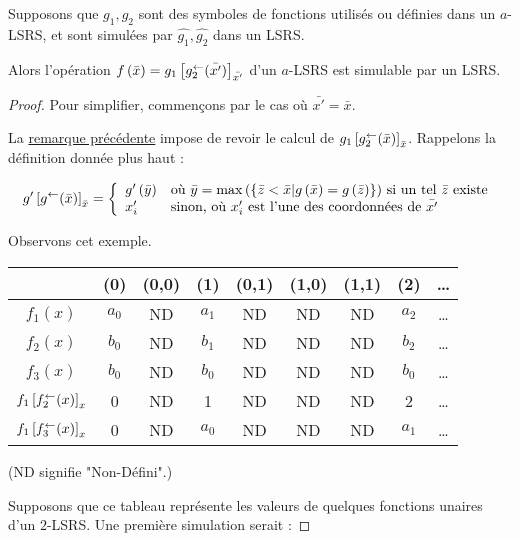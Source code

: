 	\begin{lemma}
		Supposons que $g_1, g_2$ sont des symboles de fonctions utilisés ou définies dans un $a$-LSRS, et sont simulées par $\hat{g_1},\hat{g_2}$ dans un LSRS.
		
		Alors l'opération $f\left(\bar{x}\right) = g_1\left[ g_2^{\leftarrow}(\bar{x'}) \right]_{\bar{x'}}$ d'un $a$-LSRS est simulable par un LSRS.
	\end{lemma}
	
	\begin{proof}		
		Pour simplifier, commençons par le cas où $\bar{x'} = \bar{x}$. 
		
		La \hyperref[rk:fonctions_en_attente]{remarque précédente} impose de revoir le calcul de $g_1\left[ g_2^{\leftarrow}(\bar{x}) \right]_{\bar{x}}$. Rappelons la définition donnée plus haut : 
		
		\[
			g'\left[ g^{\leftarrow}(\bar{x}) \right]_{\bar{x}} = \left\lbrace \begin{array}{ll} 
				g'\left( \bar{y} \right) & \text{où $\bar{y} = \max\left( \left\lbrace \bar{z} < \bar{x} | g\left( \bar{x} \right) = g\left( \bar{z} \right) \right\rbrace \right)$ si un tel $\bar{z}$ existe} \\
				x'_i & \text{sinon, où $x'_i$ est l'une des coordonnées de $\bar{x'}$}
			 \end{array} \right.
		\]
		
		Observons cet exemple.
		
		\espace 
		\begin{center}
			\begin{tabular}{|c|cccccccc|}
				\hline
									& (0)	& (0,0)	& (1)	& (0,1)	& (1,0)	& (1,1)	& (2)	& \dots \\
				\hline
				$f_1(x)$ 			& $a_0$	& ND	& $a_1$	& ND	& ND	& ND	& $a_2$	& \dots \\
				$f_2(x)$ 			& $b_0$	& ND	& $b_1$	& ND	& ND	& ND	& $b_2$	& \dots \\
				$f_3(x)$	 		& $b_0$	& ND	& $b_0$	& ND	& ND	& ND	& $b_0$	& \dots \\
				$f_1\left[ f_2^{\leftarrow}(x) \right]_{x}$
									& 0		& ND	& 1		& ND	& ND	& ND	& 2		& \dots \\
				$f_1\left[ f_3^{\leftarrow}(x) \right]_{x}$
									& 0		& ND	& $a_0$	& ND	& ND	& ND	& $a_1$	& \dots \\
				\hline 
				
			\end{tabular}
		\end{center}

			
		\espace 
		(ND signifie "Non-Défini".)
			
		Supposons que ce tableau représente les valeurs de quelques fonctions unaires d'un $2$-LSRS. Une première simulation serait :
		

\end{proof}
